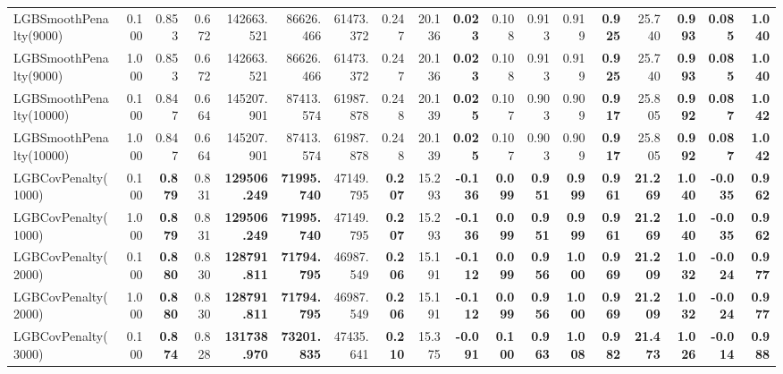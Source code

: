 \documentclass[11pt]{article}
\theoremstyle{plain}
\theoremstyle{definition}
\newcommand{\1}{\mathbf{1}}
\begin{document}
\begin{table}[htbp]
{\begin{tabular}{lrrrrrrrrrrrrrrrrr}
LGBSmoothPenalty(9000) & 0.100 & 0.853 & 0.672 & 142663.521 & 86626.466 & 61473.372 & 0.247 & 20.136 & \textbf{0.023} & 0.108 & 0.913 & 0.919 & \textbf{0.925} & 25.740 & \textbf{0.993} & \textbf{0.085} & \textbf{1.040} \\
LGBSmoothPenalty(9000) & 1.000 & 0.853 & 0.672 & 142663.521 & 86626.466 & 61473.372 & 0.247 & 20.136 & \textbf{0.023} & 0.108 & 0.913 & 0.919 & \textbf{0.925} & 25.740 & \textbf{0.993} & \textbf{0.085} & \textbf{1.040} \\
LGBSmoothPenalty(10000) & 0.100 & 0.847 & 0.664 & 145207.901 & 87413.574 & 61987.878 & 0.248 & 20.139 & \textbf{0.025} & 0.107 & 0.903 & 0.909 & \textbf{0.917} & 25.805 & \textbf{0.992} & \textbf{0.087} & \textbf{1.042} \\
LGBSmoothPenalty(10000) & 1.000 & 0.847 & 0.664 & 145207.901 & 87413.574 & 61987.878 & 0.248 & 20.139 & \textbf{0.025} & 0.107 & 0.903 & 0.909 & \textbf{0.917} & 25.805 & \textbf{0.992} & \textbf{0.087} & \textbf{1.042} \\
LGBCovPenalty(1000) & 0.100 & \textbf{0.879} & 0.831 & \textbf{129506.249} & \textbf{71995.740} & 47149.795 & \textbf{0.207} & 15.293 & \textbf{-0.136} & \textbf{0.099} & \textbf{0.951} & \textbf{0.999} & \textbf{0.961} & \textbf{21.269} & \textbf{1.040} & \textbf{-0.035} & \textbf{0.962} \\
LGBCovPenalty(1000) & 1.000 & \textbf{0.879} & 0.831 & \textbf{129506.249} & \textbf{71995.740} & 47149.795 & \textbf{0.207} & 15.293 & \textbf{-0.136} & \textbf{0.099} & \textbf{0.951} & \textbf{0.999} & \textbf{0.961} & \textbf{21.269} & \textbf{1.040} & \textbf{-0.035} & \textbf{0.962} \\
LGBCovPenalty(2000) & 0.100 & \textbf{0.880} & 0.830 & \textbf{128791.811} & \textbf{71794.795} & 46987.549 & \textbf{0.206} & 15.191 & \textbf{-0.112} & \textbf{0.099} & \textbf{0.956} & \textbf{1.000} & \textbf{0.969} & \textbf{21.209} & \textbf{1.032} & \textbf{-0.024} & \textbf{0.977} \\
LGBCovPenalty(2000) & 1.000 & \textbf{0.880} & 0.830 & \textbf{128791.811} & \textbf{71794.795} & 46987.549 & \textbf{0.206} & 15.191 & \textbf{-0.112} & \textbf{0.099} & \textbf{0.956} & \textbf{1.000} & \textbf{0.969} & \textbf{21.209} & \textbf{1.032} & \textbf{-0.024} & \textbf{0.977} \\
LGBCovPenalty(3000) & 0.100 & \textbf{0.874} & 0.828 & \textbf{131738.970} & \textbf{73201.835} & 47435.641 & \textbf{0.210} & 15.375 & \textbf{-0.091} & \textbf{0.100} & \textbf{0.963} & \textbf{1.008} & \textbf{0.982} & \textbf{21.473} & \textbf{1.026} & \textbf{-0.014} & \textbf{0.988} \\

\end{tabular}}
\end{table}
\end{document}
